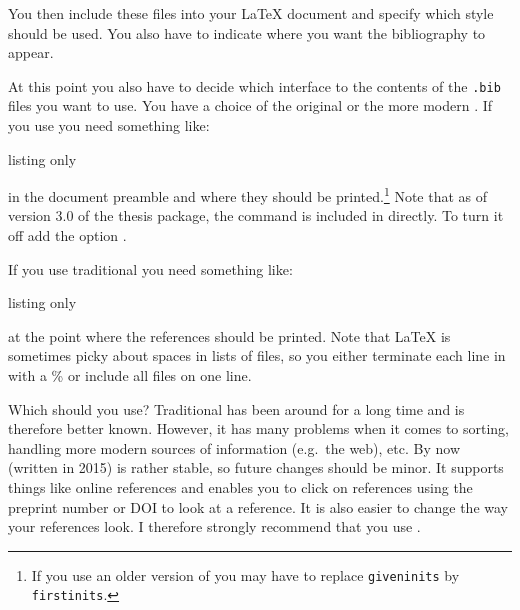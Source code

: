 You then include these files into your \LaTeX{} document and
specify which style should be used.
You also have to indicate where you want the bibliography to appear.

At this point you also have to decide which interface to the contents
of the \texttt{.bib} files you want to use. You have a choice of the
original \BibTeX{} or the more modern
.
If you use  you need something like:
\begin{tcblisting}{listing only}
\usepackage[backend=biber,
  style=numeric-comp, sorting=none, block=ragged, giveninits=true]{biblatex}

\usepackage{ubonn-biblatex}



\end{tcblisting}
in the document preamble and  where they
should be printed.\footnote{%
If you use an older version of \TeXLive you may have to replace
\texttt{giveninits} by \texttt{firstinits}.}
Note that as of version 3.0 of the thesis package,
the  command is included in  directly.
To turn it off add the option .
\par\noindent
If you use traditional \BibTeX{} you need something like:
\begin{tcblisting}{listing only}

% 

\end{tcblisting}
at the point where the references should be printed.
Note that \LaTeX{} is sometimes picky about spaces in lists of files,
so you either terminate each line in  with a \% or include all files on one line.

Which should you use? Traditional \BibTeX{} has been around for a long time and is
therefore better known. However, it has many problems when it comes to
sorting, handling more modern sources of information (e.g.\ the web),
etc. 
By now (written in 2015)  is rather stable,
so future changes should be minor.
It supports things like online references and enables you to click on references
using the preprint number or DOI to look at a reference. It is also
easier to change the way your references look. I therefore
strongly recommend that you use .

